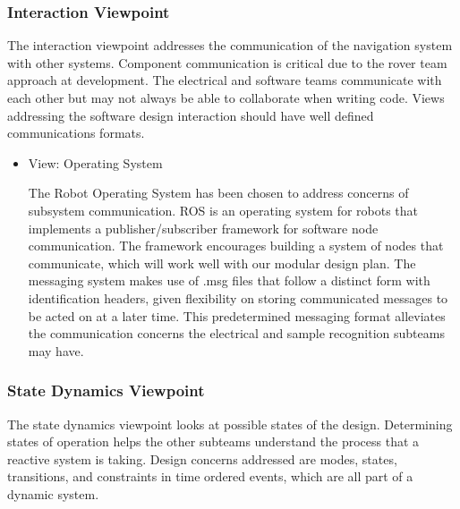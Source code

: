 \documentclass[10pt, oneside,onecolumn]{IEEEtran}
\begin{document}
\subsubsection{Interaction Viewpoint}

The interaction viewpoint addresses the communication of the navigation system with other systems. Component communication is critical due to the rover team approach at development. The electrical and software teams communicate with each other but may not always be able to collaborate when writing code. Views addressing the software design interaction should have well defined communications formats. 

\begin{itemize}

\item View: Operating System

The Robot Operating System has been chosen to address concerns of subsystem communication. ROS is an operating system for robots that implements a publisher/subscriber framework for software node communication. The framework encourages building a system of nodes that communicate, which will work well with our modular design plan. The messaging system makes use of .msg files that follow a distinct form with identification headers, given flexibility on storing communicated messages to be acted on at a later time. This predetermined messaging format alleviates the communication concerns the electrical and sample recognition subteams may have.
\end{itemize}

\subsubsection{State Dynamics Viewpoint}

The state dynamics viewpoint looks at possible states of the design. Determining states of operation helps the other subteams understand the process that a reactive system is taking. Design concerns addressed are modes, states, transitions, and constraints in time ordered events, which are all part of a dynamic system. 
\end{document}
